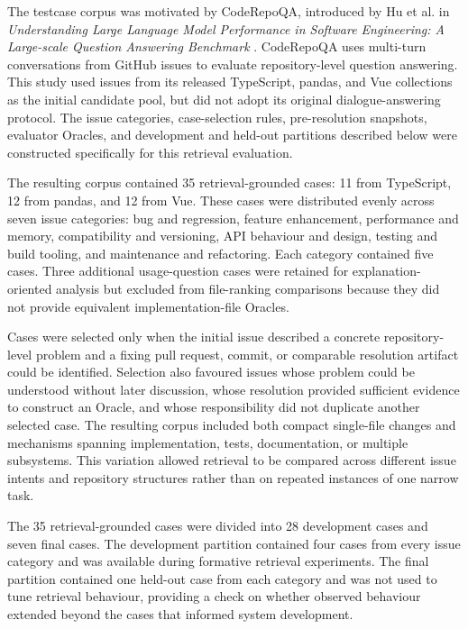 The testcase corpus was motivated by CodeRepoQA, introduced by Hu et al. in \emph{Understanding Large Language Model Performance in Software Engineering: A Large-scale Question Answering Benchmark} \cite{Hu2025CodeRepoQA}. CodeRepoQA uses multi-turn conversations from GitHub issues to evaluate repository-level question answering. This study used issues from its released TypeScript, pandas, and Vue collections as the initial candidate pool, but did not adopt its original dialogue-answering protocol. The issue categories, case-selection rules, pre-resolution snapshots, evaluator Oracles, and development and held-out partitions described below were constructed specifically for this retrieval evaluation.

The resulting corpus contained 35 retrieval-grounded cases: 11 from TypeScript, 12 from pandas, and 12 from Vue. These cases were distributed evenly across seven issue categories: bug and regression, feature enhancement, performance and memory, compatibility and versioning, API behaviour and design, testing and build tooling, and maintenance and refactoring. Each category contained five cases. Three additional usage-question cases were retained for explanation-oriented analysis but excluded from file-ranking comparisons because they did not provide equivalent implementation-file Oracles.

Cases were selected only when the initial issue described a concrete repository-level problem and a fixing pull request, commit, or comparable resolution artifact could be identified. Selection also favoured issues whose problem could be understood without later discussion, whose resolution provided sufficient evidence to construct an Oracle, and whose responsibility did not duplicate another selected case. The resulting corpus included both compact single-file changes and mechanisms spanning implementation, tests, documentation, or multiple subsystems. This variation allowed retrieval to be compared across different issue intents and repository structures rather than on repeated instances of one narrow task.

The 35 retrieval-grounded cases were divided into 28 development cases and seven final cases. The development partition contained four cases from every issue category and was available during formative retrieval experiments. The final partition contained one held-out case from each category and was not used to tune retrieval behaviour, providing a check on whether observed behaviour extended beyond the cases that informed system development.

